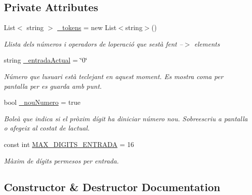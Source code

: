 \subsection*{Private Attributes}
\begin{DoxyCompactItemize}
\item 
List$<$ string $>$ \mbox{\hyperlink{class_p_a_c4___calculadora_1_1_main_window_a5d6e70e81a8225be10dd77d9dd7ee9b4}{\+\_\+tokens}} = new List$<$string$>$()
\begin{DoxyCompactList}\small\item\em Llista dels números i operadors de l\textquotesingle{}operació que s\textquotesingle{}està fent --$>$ elements \end{DoxyCompactList}\item 
string \mbox{\hyperlink{class_p_a_c4___calculadora_1_1_main_window_a73e58986923c484ea3ac05d2d6d71915}{\+\_\+entrada\+Actual}} = \char`\"{}0\char`\"{}
\begin{DoxyCompactList}\small\item\em Número que l\textquotesingle{}usuari està teclejant en aquest moment. Es mostra coma per pantalla per es guarda amb punt. \end{DoxyCompactList}\item 
bool \mbox{\hyperlink{class_p_a_c4___calculadora_1_1_main_window_ac3beb81b14960e319ce0b1cea97c9b36}{\+\_\+nou\+Numero}} = true
\begin{DoxyCompactList}\small\item\em Boleà que indica si el pròxim dígit ha d\textquotesingle{}iniciar número nou. Sobreescriu a pantalla o afegeix al costat de l\textquotesingle{}actual. \end{DoxyCompactList}\item 
const int \mbox{\hyperlink{class_p_a_c4___calculadora_1_1_main_window_a076e89ab8f4a2dc5e7653933ce7ebe22}{M\+A\+X\+\_\+\+D\+I\+G\+I\+T\+S\+\_\+\+E\+N\+T\+R\+A\+DA}} = 16
\begin{DoxyCompactList}\small\item\em Màxim de dígits permesos per entrada. \end{DoxyCompactList}\end{DoxyCompactItemize}


\subsection{Constructor \& Destructor Documentation}
\mbox{\label{class_p_a_c4___calculadora_1_1_main_window_a3332f70a514dc3489ebb21285d219f04}} 
